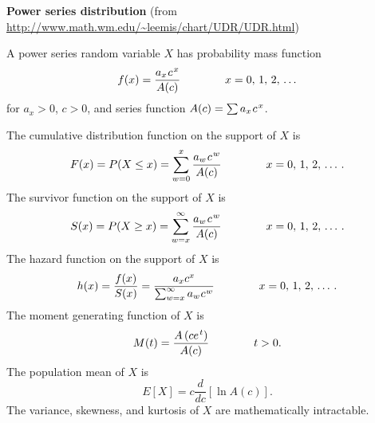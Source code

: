 \documentclass[12pt,fullpage]{article}
\begin{document}
\noindent
{\bf Power series distribution} (from \color{blue}\url{http://www.math.wm.edu/~leemis/chart/UDR/UDR.html}\color{black})

\noindent
A power series random variable $X$ has probability mass function 
$$
f(x) = \frac{a_{x} \kern 0.08 em c ^ {\kern 0.08 em x}} {A (c)} \qquad \qquad x= 0,\,1,\,2, \,\ldots 
$$
for $a_{x} > 0$, $c > 0$, and series function $A(c) = \sum a_{x} \kern 0.08 em  c ^ {\kern 0.08 em x}$.

\vspace{0.05in}

\noindent
The cumulative distribution function on the support of $X$ is
$$
F(x) = P(X \le x) = \sum_{w = 0} ^ {x} \frac{a_{w}\kern 0.08 em c ^ {\kern 0.08 em w}} {A(c)} \qquad \qquad x= 0,\,1,\,2,\, \ldots \, .
$$
The survivor function on the support of $X$ is
$$
S(x) = P(X \ge x) = \sum_{w=x} ^ {\infty} \frac{a_ {w}\kern 0.08 em c ^ {\kern 0.08 em w}} {A(c)} \qquad \qquad x= 0,\,1,\,2,\, \ldots \, .
$$
The hazard function on the support of $X$ is
$$
h(x) = \frac{f(x)}{S(x)} = \frac{a_{x} c ^ {x}}{\sum_{w = x} ^ {\infty} a_{w} \kern 0.04 em c ^ {\kern 0.04 em w}} \qquad \qquad x=
0,\,1,\,2,\, \ldots \, .
$$
The moment generating function of $X$ is
$$
M(t) = \frac{A \left( c e ^ {\kern 0.08 em t} \right)} {A(c)} \qquad \qquad t > 0.
$$
The population mean of $X$ is
$$
E[X] = c \frac{d} {d c} [\ln A(c)].
$$
The variance, skewness, and kurtosis of $X$ are mathematically intractable.\\
\vspace{0.1in}
\end{document}
